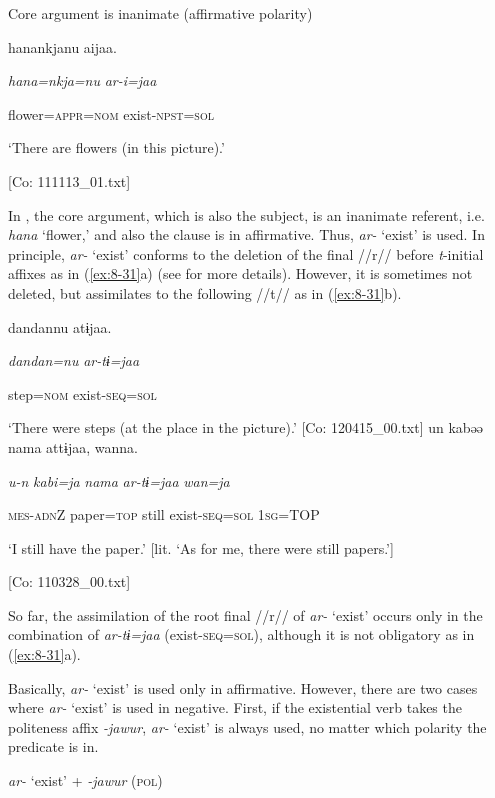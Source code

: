 \textbf{\ea\label{ex:8-30}
}  Core argument is inanimate (affirmative polarity)

  {\TM}
\glll  hanankjanu  aijaa.

    \textit{hana=nkja=nu}  \textit{ar{}-i=jaa}

    flower=\textsc{appr}=\textsc{nom}  exist-\textsc{npst}=\textsc{sol}

    ‘There are flowers (in this picture).’

    [Co: 111113\_01.txt]
\z

In , the core argument, which is also the subject, is an inanimate referent, i.e. \textit{hana} ‘flower,’ and also the clause is in affirmative. Thus, \textit{ar-} ‘exist’ is used. In principle, \textit{ar-} ‘exist’ conforms to the deletion of the final //r// before \textit{t}{}-initial affixes as in (\ref{ex:8-31}a) (see  for more details). However, it is sometimes not deleted, but assimilates to the following //t// as in (\ref{ex:8-31}b).

\textbf{\ea\label{ex:8-31}
}\ea {\TM}
\glll  dandannu  atɨjaa.

      \textit{dandan=nu}  \textit{ar-tɨ=jaa}

      step=\textsc{nom}  exist-\textsc{seq}=\textsc{sol}

\glt ‘There were steps (at the place in the picture).’ [Co: 120415\_00.txt]
\ex {\TM}
\glll  un  kabəə  nama  attɨjaa,  wanna.

      \textit{u-n}  \textit{kabi=ja}  \textit{nama}  \textit{ar-tɨ=jaa}  \textit{wan=ja}

      \textsc{mes}-\textsc{adn}Z  paper=\textsc{top}  still  exist-\textsc{seq}=\textsc{sol}  1\textsc{sg}=TOP

\glt ‘I still have the paper.’ [lit. ‘As for me, there were still papers.’]

      [Co: 110328\_00.txt]
\z

So far, the assimilation of the root final //r// of \textit{ar-} ‘exist’ occurs only in the combination of \textit{ar-tɨ=jaa} (exist-\textsc{seq}=\textsc{sol}), although it is not obligatory as in (\ref{ex:8-31}a).

  Basically, \textit{ar-} ‘exist’ is used only in affirmative. However, there are two cases where \textit{ar-} ‘exist’ is used in negative. First, if the existential verb takes the politeness affix \textit{{}-jawur}, \textit{ar-} ‘exist’ is always used, no matter which polarity the predicate is in.

\textbf{\ea\label{ex:8-32}
}  \textit{ar-} ‘exist’ + \textit{{}-jawur} (\textsc{pol})

